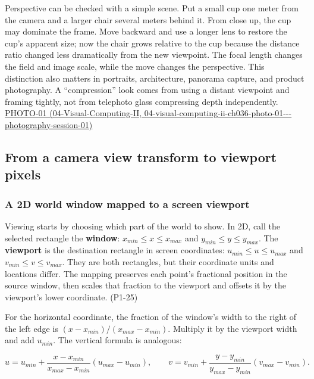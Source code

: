 Perspective can be checked with a simple scene. Put a small cup one meter from the camera and a larger chair several meters behind it. From close up, the cup may dominate the frame. Move backward and use a longer lens to restore the cup's apparent size; now the chair grows relative to the cup because the distance ratio changed less dramatically from the new viewpoint. The focal length changes the field and image scale, while the move changes the perspective. This distinction also matters in portraits, architecture, panorama capture, and product photography. A ``compression'' look comes from using a distant viewpoint and framing tightly, not from telephoto glass compressing depth independently. \href{../04-Visual-Computing-II/main.pdf\#nameddest=04-visual-computing-ii-ch036-photo-01---photography-session-01}{PHOTO-01 (04-Visual-Computing-II, 04-visual-computing-ii-ch036-photo-01-\/-\/-photography-session-01)}

\subsection{From a camera view transform to viewport pixels}\label{03-visual-computing-i-ch003-from-a-camera-view-transform-to-viewport-pixels}

\subsubsection{A 2D world window mapped to a screen viewport}\label{03-visual-computing-i-ch003-a-2d-world-window-mapped-to-a-screen-viewport}

Viewing starts by choosing which part of the world to show. In 2D, call the selected rectangle the \textbf{window}: \(x_{min}\leq x\leq x_{max}\) and \(y_{min}\leq y\leq y_{max}\). The \textbf{viewport} is the destination rectangle in screen coordinates: \(u_{min}\leq u\leq u_{max}\) and \(v_{min}\leq v\leq v_{max}\). They are both rectangles, but their coordinate units and locations differ. The mapping preserves each point's fractional position in the source window, then scales that fraction to the viewport and offsets it by the viewport's lower coordinate. (P1-25)

For the horizontal coordinate, the fraction of the window's width to the right of the left edge is \((x-x_{min})/(x_{max}-x_{min})\). Multiply it by the viewport width and add \(u_{min}\). The vertical formula is analogous:

\[
u=u_{min}+\frac{x-x_{min}}{x_{max}-x_{min}}(u_{max}-u_{min}),\qquad
v=v_{min}+\frac{y-y_{min}}{y_{max}-y_{min}}(v_{max}-v_{min}).
\]

